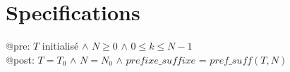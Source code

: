 \section{Specifications}\label{specifications}

@pre: $T$ initialisé $\land$ $N \geq 0$ $\land$ $0 \leq k \leq N-1$ \\
\indent @post: $T = T_0$ $\land$ $N = N_0$ $\land$ $prefixe\_suffixe$ = $pref\_suff(T, N)$
